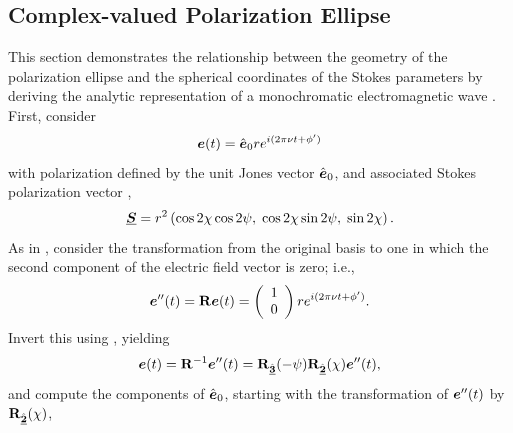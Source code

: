 
\subsection{Complex-valued Polarization Ellipse}
\label{app:analytic_polarization_ellipse}

This section demonstrates the relationship between the 
geometry of the polarization ellipse 
and the
spherical coordinates of the Stokes parameters 
%
by deriving the analytic representation of a monochromatic electromagnetic wave .
%
First, consider 
\begin{equation}
\Jcol{e}(t) = \hat{\Jcol{e}}_0 r e^{\Ci (2\pi \nu t + \phi')}
\end{equation}
%
with polarization defined by the unit Jones vector $\hat{\Jcol{e}}_0$,
and associated Stokes polarization vector ,
%
\begin{equation}
\Pv{S} = r^2 \left( \cos2\chi  \cos2\psi, \; \cos2\chi  \sin2\psi, \; \sin2\chi \right).
\label{eqn:equivalent_stokes}
\end{equation}
%
As in , consider the transformation from the original basis to one in which the second component of the electric field vector is zero; i.e.,
%
\begin{equation}
	\Jcol{e}''(t) = \JM{R} \Jcol{e}(t) =
	\left( 
	\begin{array}{c}
         1 \\
		0
	\end{array}
	\right) r e^{\Ci (2\pi \nu t + \phi')}.
\end{equation}
%
Invert this using , yielding
%
\begin{equation}
\Jcol{e}(t) = \JM{R}^{-1} \Jcol{e}''(t) = \vRotation[3](-\psi) \vRotation[2](\chi) \Jcol{e}''(t),
\end{equation}
%
and compute the components of $\hat{\Jcol{e}}_0$, starting with
%
the transformation of $\Jcol{e}''(t)$ by $\vRotation[2](\chi)$,
